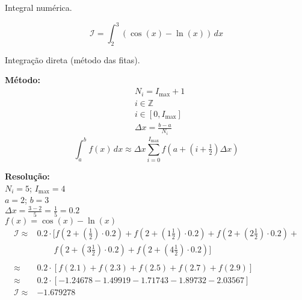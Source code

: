 \documentclass[11pt]{homework}
\begin{document}
    \maketitle
    
    \question Integral numérica.
    
    \begin{equation*}
        \pmb{\mathcal{I}} = \int_2^3 ( \cos(x) - \ln(x) ) \,dx
    \end{equation*}
    
    \begin{alphaparts}
        
        \questionpart Integração direta (método das fitas).
        
        \textbf{Método:}
        \begin{align*}
            & N_i = I_\text{max} + 1\\
            & i \in \mathbb{Z}\\
            & i \in [0, I_\text{max}]\\
            & \Delta x = \frac{b-a}{N_i}
        \end{align*}
        \begin{equation*}
            \int_a^b f(x) \,dx \approx \Delta x \sum_{i=0}^{I_\text{max}} f(a+(i+ \tfrac{1}{2})\Delta x)
        \end{equation*}
        
        \textbf{Resolução:}\\
        $N_i = 5$; $I_\text{max} = 4$\\
        $a=2$; $b=3$\\
        $\Delta x = \frac{3-2}{5} = \frac{1}{5} = \pmb{0.2}$\\
        $f(x) = \cos(x) - \ln(x)$
        \begin{align*}
            \pmb{\mathcal{I}} \approx & 0.2 \cdot [ f(2 + (\tfrac{1}{2})\cdot0.2) + f(2 + (1\tfrac{1}{2})\cdot0.2) + f(2 + (2\tfrac{1}{2})\cdot0.2) +\\
            & \qquad f(2 + (3\tfrac{1}{2})\cdot0.2) + f(2 + (4\tfrac{1}{2})\cdot0.2) ]\\
            \\
            \approx & 0.2 \cdot [ f(2.1) + f(2.3) + f(2.5) + f(2.7) + f(2.9) ]\\
            \approx & 0.2 \cdot [ -1.24678 - 1.49919 - 1.71743 - 1.89732 - 2.03567 ]\\
            \pmb{\mathcal{I}} \approx & -1.679278
        \end{align*}
        

\end{alphaparts}
\end{document}
